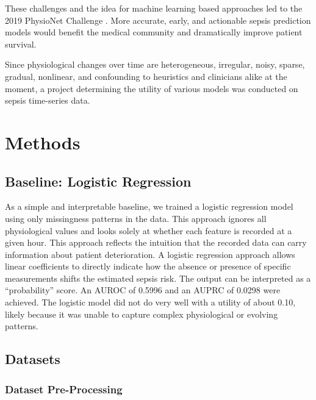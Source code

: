 \documentclass{article}
\theoremstyle{plain}
\theoremstyle{definition}
\theoremstyle{remark}
\begin{document}
These challenges and the idea for machine learning based approaches led to the 2019 PhysioNet Challenge \cite{singer2016sepsis3, reyna2019early, goldberger2000physionet}. More accurate, early, and actionable sepsis prediction models would benefit the medical community and dramatically improve patient survival.

Since physiological changes over time are heterogeneous, irregular, noisy, sparse, gradual, nonlinear, and confounding to heuristics and clinicians alike at the moment, a project determining the utility of various models was conducted on sepsis time-series data.

\section{Methods}

\subsection{Baseline: Logistic Regression}
As a simple and interpretable baseline, we trained a logistic regression model using only missingness patterns in the data. This approach ignores all physiological values and looks solely at whether each feature is recorded at a given hour. This approach reflects the intuition that the recorded data can carry information about patient deterioration. A logistic regression approach allows linear coefficients to directly indicate how the absence or presence of specific measurements shifts the estimated sepsis risk. The output can be interpreted as a “probability” score. An AUROC of 0.5996 and an AUPRC of 0.0298 were achieved. The logistic model did not do very well with a utility of about 0.10, likely because it was unable to capture complex physiological or evolving patterns.

\subsection{Datasets}

\subsubsection{Dataset Pre-Processing}
\end{document}
